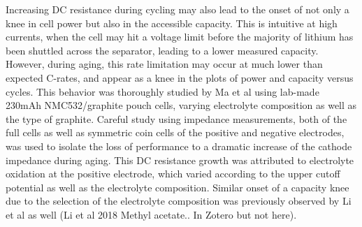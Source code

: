 \documentclass{article}
\begin{document}
Increasing DC resistance during cycling may also lead to the onset of not only a knee in cell power but also in the accessible capacity. This is intuitive at high currents, when the cell may hit a voltage limit before the majority of lithium has been shuttled across the separator, leading to a lower measured capacity. However, during aging, this rate limitation may occur at much lower than expected C-rates, and appear as a knee in the plots of power and capacity versus cycles. This behavior was thoroughly studied by Ma et al \cite{ma_editors_2019} using lab-made 230mAh NMC532/graphite pouch cells, varying electrolyte composition as well as the type of graphite. Careful study using impedance measurements, both of the full cells as well as symmetric coin cells of the positive and negative electrodes, was used to isolate the loss of performance to a dramatic increase of the cathode impedance during aging. This DC resistance growth was attributed to electrolyte oxidation at the positive electrode, which varied according to the upper cutoff potential as well as the electrolyte composition. Similar onset of a capacity knee due to the selection of the electrolyte composition was previously observed by Li et al as well (Li et al 2018 Methyl acetate.. In Zotero but not here). 
\end{document}

